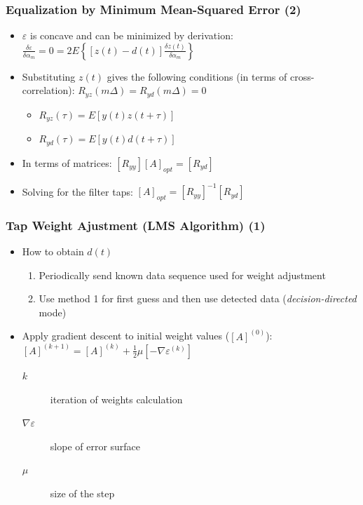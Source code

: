\documentclass{beamer}
\begin{document}
\begin{frame}
	\frametitle{Equalization by Minimum Mean-Squared Error (2)}
	\begin{itemize}
		\item $ \varepsilon $ is concave and can be minimized by derivation: $ \frac{\delta\varepsilon}{\delta\alpha_m} = 0 = 2E\left\{[z(t) - d(t)] \frac{\delta z(t)}{\delta\alpha_m} \right\} $
		\item Substituting $ z(t) $ gives the following conditions (in terms of cross-correlation): $ R_{yz}(m\Delta) = R_{yd}(m\Delta) = 0 $
		\begin{itemize}
			\item $ R_{yz}(\tau) = E[y(t)z(t + \tau)] $
			\item $ R_{yd}(\tau) = E[y(t)d(t + \tau)] $
		\end{itemize}
		\item In terms of matrices: $ [R_{yy}][A]_{opt} = [R_{yd}] $
		\item Solving for the filter taps: $ [A]_{opt} = [R_{yy}]^{-1}[R_{yd}] $
	\end{itemize}
\end{frame}

\begin{frame}
	\frametitle{Tap Weight Ajustment (LMS Algorithm) (1)}
	\begin{itemize}
		\item How to obtain $ d(t) $
		\begin{enumerate}
			\item Periodically send known data sequence used for weight adjustment
			\item Use method 1 for first guess and then use detected data (\emph{decision-directed} mode)
		\end{enumerate}
		\item Apply gradient descent to initial weight values ($ [A]^{(0)} $): $ [A]^{(k+1)} = [A]^{(k)} + \frac{1}{2}\mu [-\nabla\varepsilon^{(k)}] $
		\begin{description}
			\item[$ k $] iteration of weights calculation
			\item[$ \nabla\varepsilon $] slope of error surface
			\item[$ \mu $] size of the step
		\end{description}
	\end{itemize}
\end{frame}
\end{document}

